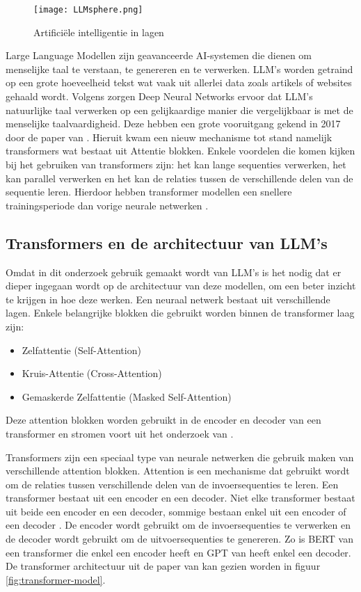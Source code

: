 \begin{figure}[h]
  \centering
  \texttt{[image: LLMsphere.png]}
  \caption{Artificiële intelligentie in lagen \autocite{Stoeffelbauer2023}}
  \label{fig:LLM-position}
\end{figure}

Large Language Modellen zijn geavanceerde AI-systemen die dienen om menselijke taal te verstaan, te genereren en te verwerken.
LLM's worden getraind op een grote hoeveelheid tekst wat vaak uit allerlei data zoals artikels of websites gehaald wordt. 
Volgens \textcite{Beelen2023} zorgen Deep Neural Networks ervoor dat LLM's natuurlijke taal verwerken op een gelijkaardige manier die vergelijkbaar is met de menselijke taalvaardigheid.
Deze hebben een grote vooruitgang gekend in 2017 door de paper van \textcite{VaswaniEtAl2017}. 
Hieruit kwam een nieuw mechanisme tot stand namelijk transformers wat bestaat uit Attentie blokken. 
Enkele voordelen die komen kijken bij het gebruiken van transformers zijn: het kan lange sequenties verwerken, het kan parallel verwerken en het kan de relaties tussen de verschillende delen van de sequentie leren.
Hierdoor hebben transformer modellen een snellere trainingsperiode dan vorige neurale netwerken \autocite{aiml2023}.

\subsection{Transformers en de architectuur van LLM's}
\label{sec:architectuur-van-llms}
Omdat in dit onderzoek gebruik gemaakt wordt van LLM's is het nodig dat er dieper ingegaan wordt op de architectuur van deze modellen, om een beter inzicht te krijgen in hoe deze werken.
Een neuraal netwerk bestaat uit verschillende lagen. Enkele belangrijke blokken die gebruikt worden binnen de transformer laag zijn:
\begin{itemize}
  \item Zelfattentie (Self-Attention)
  \item Kruis-Attentie (Cross-Attention)
  \item Gemaskerde Zelfattentie (Masked Self-Attention)
\end{itemize}

Deze attention blokken worden gebruikt in de encoder en decoder van een transformer en stromen voort uit het onderzoek van \textcite{VaswaniEtAl2017}.

Transformers zijn een speciaal type van neurale netwerken die gebruik maken van verschillende attention blokken.
Attention is een mechanisme dat gebruikt wordt om de relaties tussen verschillende delen van de invoersequenties te leren.
Een transformer bestaat uit een encoder en een decoder. 
Niet elke transformer bestaat uit beide een encoder en een decoder, sommige bestaan enkel uit een encoder of een decoder \autocite{Hoque2023}.
De encoder wordt gebruikt om de invoersequenties te verwerken en de decoder wordt gebruikt om de uitvoersequenties te genereren.
Zo is BERT van \textcite{DevlinEtAl2019} een transformer die enkel een encoder heeft en GPT van \textcite{RandfordEtAL2018} heeft enkel een decoder.
De transformer architectuur uit de paper van \textcite{VaswaniEtAl2017} kan gezien worden in figuur \ref{fig:transformer-model}. 

